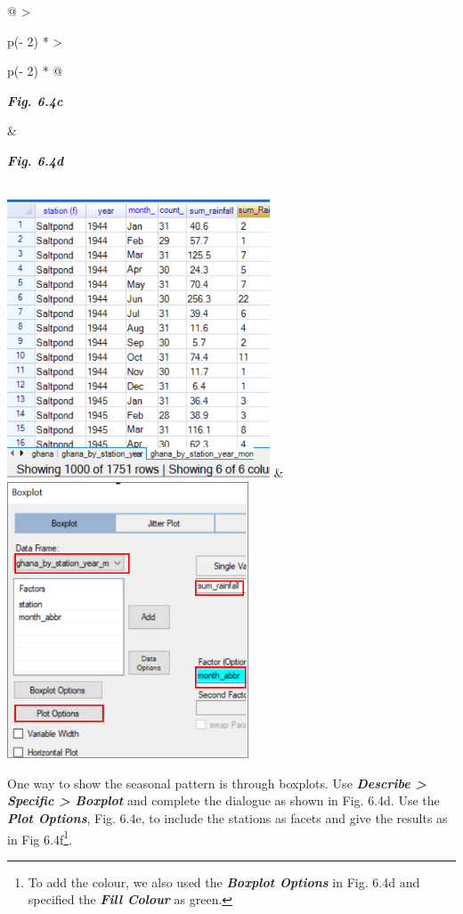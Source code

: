 \documentclass[
  letterpaper,
  DIV=11,
  numbers=noendperiod]{scrreprt}
\begin{document}
\begin{longtable}[]{@{}
  >{\raggedright\arraybackslash}p{(\columnwidth - 2\tabcolsep) * }
  >{\raggedright\arraybackslash}p{(\columnwidth - 2\tabcolsep) * }@{}}
\toprule\noalign{}
\begin{minipage}[b]{\linewidth}\raggedright
\textbf{\emph{Fig. 6.4c}}
\end{minipage} & \begin{minipage}[b]{\linewidth}\raggedright
\textbf{\emph{Fig. 6.4d}}
\end{minipage} \\
\midrule\noalign{}
\endhead
\bottomrule\noalign{}
\endlastfoot
\includegraphics[width=3.07108in,height=3.24673in]{figures/Fig6.4c.png}
&
\includegraphics[width=2.8241in,height=3.23767in]{figures/Fig6.4d.png} \\
\end{longtable}

One way to show the seasonal pattern is through boxplots. Use
\textbf{\emph{Describe \textgreater{} Specific \textgreater{} Boxplot}}
and complete the dialogue as shown in Fig. 6.4d. Use the
\textbf{\emph{Plot Options}}, Fig. 6.4e, to include the stations as
facets and give the results as in Fig 6.4f\footnote{To add the colour,
  we also used the \textbf{\emph{Boxplot Options}} in Fig. 6.4d and
  specified the \textbf{\emph{Fill Colour}} as green.}.
\end{document}
